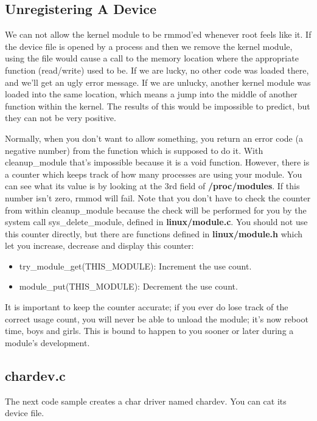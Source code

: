 \documentclass[10pt, oneside]{book}
\begin{document}
\subsection{Unregistering A Device}
\label{sec:unregister_device}
We can not allow the kernel module to be rmmod'ed whenever root feels like it.
If the device file is opened by a process and then we remove the kernel module, using the file would cause a call to the memory location where the appropriate function (read/write) used to be.
If we are lucky, no other code was loaded there, and we'll get an ugly error message.
If we are unlucky, another kernel module was loaded into the same location, which means a jump into the middle of another function within the kernel.
The results of this would be impossible to predict, but they can not be very positive.

Normally, when you don't want to allow something, you return an error code (a negative number) from the function which is supposed to do it.
With cleanup\_module that's impossible because it is a void function.
However, there is a counter which keeps track of how many processes are using your module.
You can see what its value is by looking at the 3rd field of \textbf{/proc/modules}.
If this number isn't zero, rmmod will fail. Note that you don't have to check the counter from within cleanup\_module because the check will be performed for you by the system call sys\_delete\_module, defined in \textbf{linux/module.c}.
You should not use this counter directly, but there are functions defined in \textbf{linux/module.h} which let you increase, decrease and display this counter:

\begin{itemize}
\item try\_module\_get(THIS\_MODULE): Increment the use count.
\item module\_put(THIS\_MODULE): Decrement the use count.
\end{itemize}

It is important to keep the counter accurate; if you ever do lose track of the correct usage count, you will never be able to unload the module; it's now reboot time, boys and girls.
This is bound to happen to you sooner or later during a module's development.

\subsection{chardev.c}
\label{sec:org7ce767e}
The next code sample creates a char driver named chardev.
You can cat its device file.
\end{document}
